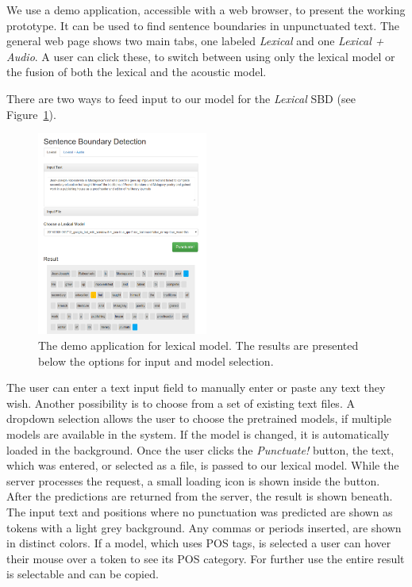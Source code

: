 We use a demo application, accessible with a web browser, to present the working prototype.
It can be used to find sentence boundaries in unpunctuated text.
The general web page shows two main tabs, one labeled \emph{Lexical} and one \emph{Lexical + Audio}.
A user can click these, to switch between using only the lexical model or the fusion of both the lexical and the acoustic model.

There are two ways to feed input to our model for the \emph{Lexical} SBD (see Figure~\ref{fig:demo_l}).
\begin{figure}[ht]
    \centering
    \includegraphics[width=0.5\textwidth]{img/demo_l.png}
    \caption{The demo application for lexical model. The results are presented below the options for input and model selection.}
    \label{fig:demo_l}
\end{figure}
The user can enter a text input field to manually enter or paste any text they wish.
Another possibility is to choose from a set of existing text files.
A dropdown selection allows the user to choose the pretrained models, if multiple models are available in the system.
If the model is changed, it is automatically loaded in the background.
Once the user clicks the \emph{Punctuate!} button, the text, which was entered, or selected as a file, is passed to our lexical model.
While the server processes the request, a small loading icon is shown inside the button.
After the predictions are returned from the server, the result is shown beneath.
The input text and positions where no punctuation was predicted are shown as tokens with a light grey background.
Any commas or periods inserted, are shown in distinct colors.
If a model, which uses POS tags, is selected a user can hover their mouse over a token to see its POS category.
For further use the entire result is selectable and can be copied.

